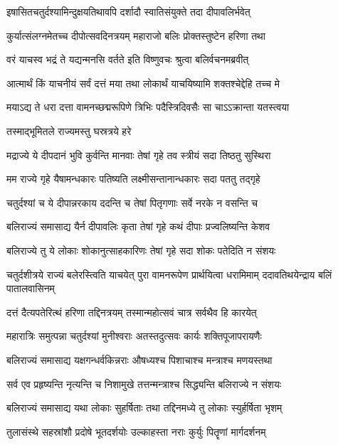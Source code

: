 \twolineshloka
{इषासितचतुर्दश्यामिन्दुक्षयतिथावपि}
{दर्शादौ स्वातिसंयुक्ते तदा दीपावलिर्भवेत्} %

\twolineshloka
{कुर्यात्संलग्नमेतच्च दीपोत्सवदिनत्रयम्}
{महाराजो बलिः प्रोक्तस्तुष्टेन हरिणा तथा} %

\twolineshloka
{वरं याचस्व भद्रं ते यद्यन्मनसि वर्तते}
{इति विष्णुवचः श्रुत्वा बलिर्वचनमब्रवीत्} %

\twolineshloka
{आत्मार्थं किं याचनीयं सर्वं दत्तं मया तथा}
{लोकार्थं याचयिष्यामि शक्तश्चेद्देहि तच्च मे} %

\twolineshloka
{मयाऽद्य ते धरा दत्ता वामनच्छद्मरूपिणे}
{त्रिभिः पदैस्त्रिदिवसैः सा चाऽऽक्रान्ता यतस्त्वया} %

\onelineshloka
{तस्माद्भूमितले राज्यमस्तु घस्रत्रये हरे} %

\twolineshloka
{मद्राज्ये ये दीपदानं भुवि कुर्वन्ति मानवाः}
{तेषां गृहे तव स्त्रीयं सदा तिष्ठतु सुस्थिरा} %

\twolineshloka
{मम राज्ये गृहे यैषामन्धकारः पतिष्यति}
{लक्ष्मीसन्तानान्धकारः सदा पततु तद्गृहे} %

\twolineshloka
{चतुर्दश्यां च ये दीपान्नरकाय ददन्ति च}
{तेषां पितृगणाः सर्वे नरके न वसन्ति च} %

\twolineshloka
{बलिराज्यं समासाद्य यैर्न दीपावलिः कृता}
{तेषां गृहे कथं दीपाः प्रज्वलिष्यन्ति केशव} %

\twolineshloka
{बलिराज्ये तु ये लोकाः शोकानुत्साहकारिणः}
{तेषां गृहे सदा शोकः पतेदिति न संशयः} %

\threelineshloka
{चतुर्दशीत्रये राज्यं बलेरस्त्विति याचयेत्}
{पुरा वामनरूपेण प्रार्थयित्वा धरामिमाम्}
{ददावतिथयेन्द्राय बलिं पातालवासिनम्} %

\twolineshloka
{दत्तं दैत्यपतेरित्थं हरिणा तद्दिनत्रयम्}
{तस्मान्महोत्सवं चात्र सर्वथैव हि कारयेत्} %

\twolineshloka
{महारात्रिः समुत्पन्ना चतुर्दश्यां मुनीश्वराः}
{अतस्तदुत्सवः कार्यः शक्तिपूजापरायणैः} %

\twolineshloka
{बलिराज्यं समासाद्य यक्षगन्धर्वकिन्नराः}
{औषध्यश्च पिशाचाश्च मन्त्राश्च मणयस्तथा} %

\twolineshloka
{सर्व एव प्रहृष्यन्ति नृत्यन्ति च निशामुखे}
{तत्तन्मन्त्राश्च सिद्ध्यन्ति बलिराज्ये न संशयः} %

\twolineshloka
{बलिराज्यं समासाद्य यथा लोकाः सुहर्षिताः}
{तथा तद्दिनमध्ये तु लोकाः स्युर्हर्षिता भृशम्} %

\twolineshloka
{तुलासंस्थे सहस्रांशौ प्रदोषे भूतदर्शयोः}
{उल्काहस्ता नराः कुर्युः पितॄणां मार्गदर्शनम्} %

